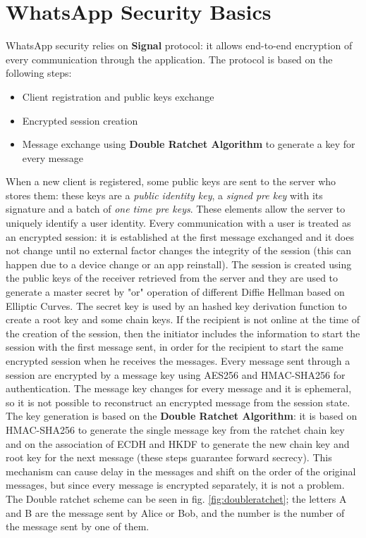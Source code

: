 \documentclass{article}
\begin{document}

\section{WhatsApp Security Basics}

WhatsApp security relies on \textbf{Signal} protocol: it allows end-to-end encryption of every communication through the application. The protocol is based on the following steps:

\begin{itemize}
	\item Client registration and public keys exchange
	\item Encrypted session creation
	\item Message exchange using \textbf{Double Ratchet Algorithm} to generate a key for every message
\end{itemize}

When a new client is registered, some public keys are sent to the server who stores them: these keys are a \textit{public identity key}, a \textit{signed pre key} with its signature and a batch of \textit{one time pre keys}. These elements allow the server to uniquely identify a user identity.\newline
Every communication with a user is treated as an encrypted session: it is established at the first message exchanged and it does not change until no external factor changes the integrity of the session (this can happen due to a device change or an app reinstall). The session is created using the public keys of the receiver retrieved from the server and they are used to generate a master secret by "or" operation of different Diffie Hellman based on Elliptic Curves. The secret key is used by an hashed key derivation function to create a root key and some chain keys. If the recipient is not online at the time of the creation of the session, then the initiator includes the information to start the session with the first message sent, in order for the recipient to start the same encrypted session when he receives the messages.\newline
Every message sent through a session are encrypted by a message key using AES256 and HMAC-SHA256 for authentication. The message key changes for every message and it is ephemeral, so it is not possible to reconstruct an encrypted message from the session state. The key generation is based on the \textbf{Double Ratchet Algorithm}: it is based on HMAC-SHA256 to generate the single message key from the ratchet chain key and on the association of ECDH and HKDF to generate the new chain key and root key for the next message (these steps guarantee forward secrecy). This mechanism can cause delay in the messages and shift on the order of the original messages, but since every message is encrypted separately, it is not a problem. The Double ratchet scheme can be seen in fig. \ref{fig:doubleratchet}; the letters A and B are the message sent by Alice or Bob, and the number is the number of the message sent by one of them.
\end{document}
